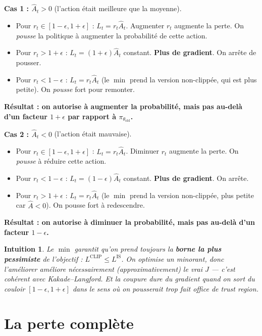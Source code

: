 \documentclass[a4paper,11pt]{article}
\theoremstyle{clean}
\newtheorem*{intu}{Intuition}
\newcommand{\piOld}{\pi_{\theta_{\text{old}}}}
\begin{document}
\textbf{Cas 1 : $\hat A_t > 0$} (l'action était meilleure que la moyenne).
\begin{itemize}[nosep,leftmargin=1.2em]
\item Pour $r_t \in [1-\epsilon, 1+\epsilon]$ : $L_t = r_t \hat A_t$. Augmenter $r_t$ augmente la perte. On \emph{pousse} la politique à augmenter la probabilité de cette action.
\item Pour $r_t > 1+\epsilon$ : $L_t = (1+\epsilon)\hat A_t$ constant. \textbf{Plus de gradient}. On arrête de pousser.
\item Pour $r_t < 1-\epsilon$ : $L_t = r_t \hat A_t$ (le $\min$ prend la version non-clippée, qui est plus petite). On \emph{pousse} fort pour remonter.
\end{itemize}
\textbf{Résultat : on autorise à augmenter la probabilité, mais pas au-delà d'un facteur $1+\epsilon$ par rapport à $\piOld$.}

\textbf{Cas 2 : $\hat A_t < 0$} (l'action était mauvaise).
\begin{itemize}[nosep,leftmargin=1.2em]
\item Pour $r_t \in [1-\epsilon, 1+\epsilon]$ : $L_t = r_t \hat A_t$. Diminuer $r_t$ augmente la perte. On \emph{pousse} à réduire cette action.
\item Pour $r_t < 1-\epsilon$ : $L_t = (1-\epsilon)\hat A_t$ constant. \textbf{Plus de gradient}. On arrête.
\item Pour $r_t > 1+\epsilon$ : $L_t = r_t \hat A_t$ (le $\min$ prend la version non-clippée, plus petite car $\hat A<0$). On pousse fort à redescendre.
\end{itemize}
\textbf{Résultat : on autorise à diminuer la probabilité, mais pas au-delà d'un facteur $1-\epsilon$.}

\begin{intu}
Le $\min$ garantit qu'on prend toujours la \textbf{borne la plus pessimiste} de l'objectif : $L^{\mathrm{CLIP}} \leq L^{\mathrm{IS}}$. On optimise un \emph{minorant}, donc l'améliorer améliore nécessairement (approximativement) le vrai $J$ --- c'est cohérent avec Kakade--Langford. Et la coupure dure du gradient quand on sort du couloir $[1-\epsilon, 1+\epsilon]$ \emph{dans le sens où on pousserait trop} fait office de trust region.
\end{intu}

\section{La perte complète}
\end{document}

